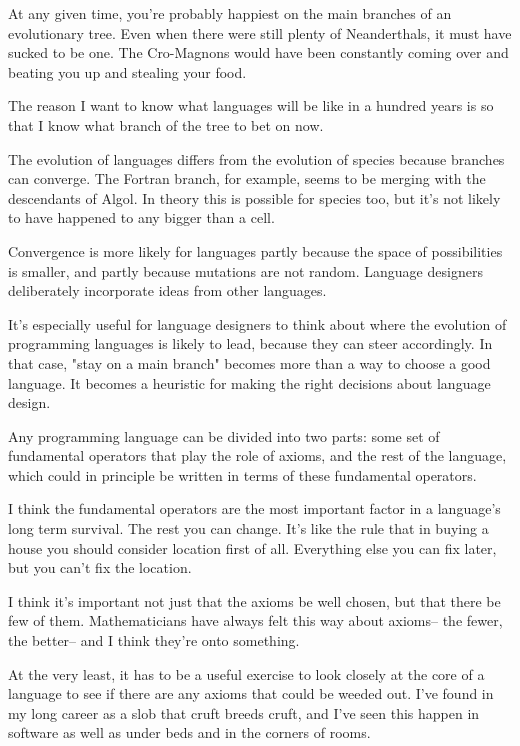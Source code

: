 At any given time, you're probably happiest on
the main branches of an evolutionary tree.
Even when there were still plenty of Neanderthals, 
it must have sucked to be one.  The
Cro-Magnons would have been constantly coming over and
beating you up and stealing your food.

The reason I want to
know what languages will be like in a hundred years is so that
I know what branch of the tree to bet on now.



The evolution of languages differs from the evolution of species
because branches can converge.  The Fortran branch, for example,
seems to be merging with the descendants
of Algol.  In theory this is possible for species too, but it's
not likely to have happened to any bigger than a cell.

Convergence
is more likely for languages partly because the space of
possibilities is smaller, and partly because mutations
are not random.  Language designers deliberately incorporate
ideas from other languages.

It's especially useful for language designers to think
about where the evolution of programming languages is likely
to lead, because they can steer accordingly. 
In that case, "stay on a main branch" becomes more than a
way to choose a good language.
It becomes a heuristic for making the right decisions about
language design.



Any programming language can be divided into
two parts:  some set of fundamental operators that play the role
of axioms, and the rest of the language, which could in principle
be written in terms of these fundamental operators.

I think the fundamental operators are the most important factor in a
language's long term survival.  The rest you can change.  It's
like the rule that in buying a house you should consider
location first of all.  Everything else you can fix later, but you
can't fix the location.

I think it's important not just that the axioms be well chosen, 
but that there be few of them.  Mathematicians have always felt 
this way about axioms-- the fewer, the better-- and I think they're
onto something.

At the very least, it has to be a useful exercise to look closely
at the core of a language to see if there are any axioms that
could be weeded out.  I've found in my long career as a slob that
cruft breeds cruft, and I've seen this happen in software as
well as under beds and in the corners of rooms.

